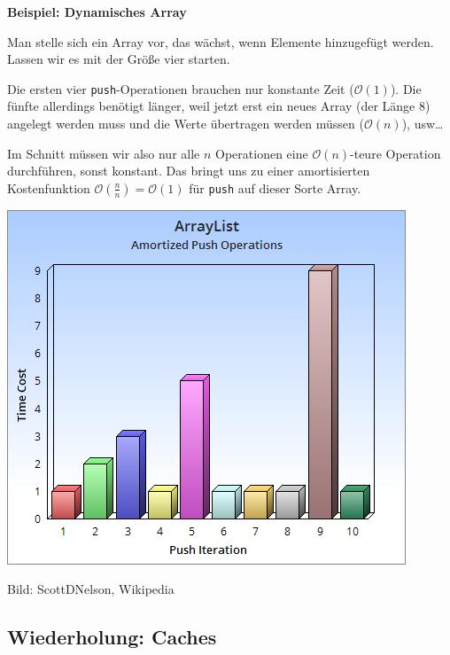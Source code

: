 \documentclass{beamer}
\begin{document}
\begin{frame}
\textbf{Beispiel: Dynamisches Array}\bigskip

Man stelle sich ein Array vor, das wächst, wenn Elemente hinzugefügt werden. Lassen wir es mit der Größe vier starten.\pause\bigskip

Die ersten vier \texttt{push}-Operationen brauchen nur konstante Zeit ($\mathcal{O}(1)$). Die fünfte allerdings benötigt länger, weil jetzt erst ein neues Array (der Länge 8) angelegt werden muss und die Werte übertragen werden müssen ($\mathcal{O}(n)$), usw\dots
\pause\bigskip

Im Schnitt müssen wir also nur alle $n$ Operationen eine $\mathcal{O}(n)$-teure Operation durchführen, sonst konstant. Das bringt uns zu einer amortisierten Kostenfunktion $\mathcal{O}\left(\frac{n}{n}\right) = \mathcal{O}(1)$ für \texttt{push} auf dieser Sorte Array.
\end{frame}


\begin{frame}
\begin{center}
\includegraphics[scale=0.5]{AmortizedPush.png} 
\end{center}
\tiny
Bild: ScottDNelson, Wikipedia
\normalsize
\end{frame}


\subsection{Wiederholung: Caches}
\end{document}
